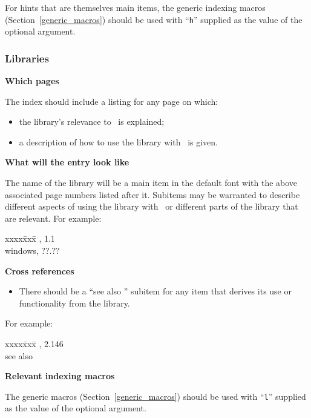 \documentclass{article}
\newenvironment{indexex}{\begin{tabbing}
xxxx\=xxx\=\kill}{\end{tabbing}}
\begin{document}
\begin{description}
        For hints that are themselves main items, the generic indexing
        macros (Section~\ref{generic_macros}) should be used with 
        ``{\tt h}'' supplied as the value of the optional argument.

\end{description}

\subsubsection{Libraries}%
\label{libraries}

\begin{description}
   \item{\bf Which pages}

         The index should include a listing for any page on which:
           \begin{itemize}
               \item the library's relevance to \cgal\ is explained;
               \item a description of how to use the library with \cgal\ is
                     given.
           \end{itemize}
   \item{\bf What will the entry look like}

         The name of the library will be a main item in the default font
         with the above associated page numbers listed after it.  
         Subitems may be warranted to describe different aspects of using the 
         library with \cgal\ or different parts of the library that are relevant.  
         For example:
         \begin{indexex}
         \leda,                                                     1.1  \\
         \>windows,                                                ??.?? \\
         \end{indexex} 
   \item{\bf Cross references} 

         \begin{itemize}
            \item There should be a ``see also ''
                  subitem for any item that derives its use or functionality
                  from the library.
         \end{itemize}
         For example:
         \begin{indexex}
         ,   2.146 \\
         \> see also \leda\ 
         \end{indexex}


   \item {\bf Relevant indexing macros}

         The generic macros (Section~\ref{generic_macros}) should be used 
         with ``{\tt l}'' supplied as the value of the optional argument.

\end{description}%
\end{document}

